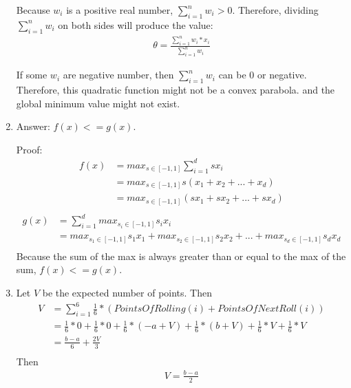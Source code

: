 \documentclass[12pt]{article}
\begin{document}
\begin{enumerate}[label=(\alph*)]
Because \(w_i\) is a positive real number, \(\sum_{i=1}^{n}w_i > 0\). Therefore, dividing \(\sum_{i=1}^{n}w_i\) on both sides will produce the value:
\begin{equation}
\begin{split}
  \theta = \frac{\sum_{i=1}^{n}w_i*x_i}{\sum_{i=1}^{n}w_i}\end{split}
\end{equation}

If some \(w_i\) are negative number, then \(\sum_{i=1}^{n}w_i\) can be 0 or negative. Therefore, this quadratic function might not be a convex parabola. and the global minimum value might not exist.

\item
Answer: \(f(x) <= g(x)\).

Proof:
\begin{equation}
\begin{split}
  f(x) &= max_{s\in[-1,1]}\sum_{i=1}^{d}s x_i \\
  &= max_{s\in[-1,1]}s(x_1 + x_2 + ... + x_d) \\
  &= max_{s\in[-1,1]}(sx_1 + sx_2 + ... + sx_d) \\
\end{split}
\end{equation}
\begin{equation}
\begin{split}
  g(x) &= \sum_{i=1}^{d}max_{s_i\in[-1,1]}s_i x_i \\
  &=max_{s_1\in[-1,1]}s_1 x_1 + max_{s_2\in[-1,1]}s_2 x_2 + ... + max_{s_d\in[-1,1]}s_d x_d \\
\end{split}
\end{equation}
Because the sum of the max is always greater than or equal to the max of the sum, \(f(x) <= g(x)\).

\item
Let \(V\) be the expected number of points. Then
\begin{equation}
\begin{split}
    V &= \sum_{i=1}^{6}\frac{1}{6} * (PointsOfRolling(i) + PointsOfNextRoll(i)) \\
    &= \frac{1}{6} * 0 + \frac{1}{6} * 0 + \frac{1}{6} * (-a + V) + \frac{1}{6} * (b + V) + \frac{1}{6} * V + \frac{1}{6} * V \\
    &= \frac{b-a}{6} + \frac{2V}{3} \\
\end{split}
\end{equation}
Then
\begin{equation}
\begin{split}
    V = \frac{b-a}{2}
\end{split}
\end{equation}


\end{enumerate}
\end{document}

